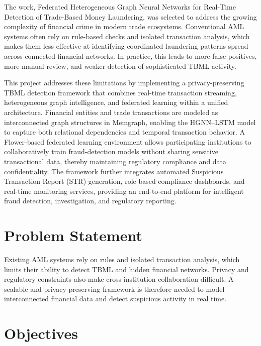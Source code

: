 The work, Federated Heterogeneous Graph Neural Networks for Real-Time Detection of Trade-Based Money Laundering, was selected to address the growing complexity of financial crime in modern trade ecosystems. Conventional AML systems often rely on rule-based checks and isolated transaction analysis, which makes them less effective at identifying coordinated laundering patterns spread across connected financial networks. In practice, this leads to more false positives, more manual review, and weaker detection of sophisticated TBML activity.

This project addresses these limitations by implementing a privacy-preserving TBML detection framework that combines real-time transaction streaming, heterogeneous graph intelligence, and federated learning within a unified architecture. Financial entities and trade transactions are modeled as interconnected graph structures in Memgraph, enabling the HGNN–LSTM model to capture both relational dependencies and temporal transaction behavior. A Flower-based federated learning environment allows participating institutions to collaboratively train fraud-detection models without sharing sensitive transactional data, thereby maintaining regulatory compliance and data confidentiality. The framework further integrates automated Suspicious Transaction Report (STR) generation, role-based compliance dashboards, and real-time monitoring services, providing an end-to-end platform for intelligent fraud detection, investigation, and regulatory reporting.
\section[Problem Statement]{\textbf{Problem Statement}}

Existing AML systems rely on rules and isolated transaction analysis, which limits their ability to detect TBML and hidden financial networks. Privacy and regulatory constraints also make cross-institution collaboration difficult. A scalable and privacy-preserving framework is therefore needed to model interconnected financial data and detect suspicious activity in real time.


\vspace{0.4cm}
\section[Objectives]{\textbf{Objectives}}

